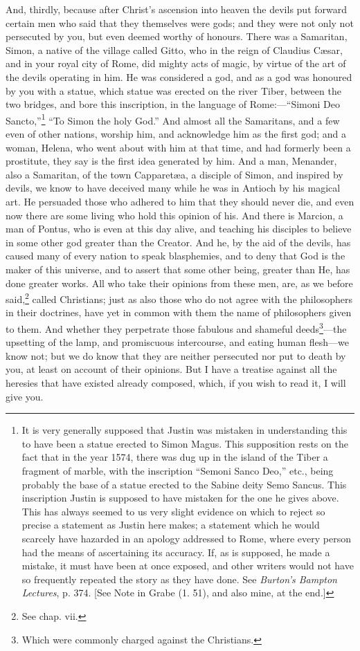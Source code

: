 And, thirdly, because after Christ’s ascension into heaven the devils put forward certain men who said that they themselves were gods; and they were not only not persecuted by you, but even deemed worthy of honours. There was a Samaritan, Simon, a native of the village called Gitto, who in the reign of Claudius Cæsar, and in your royal city of Rome, did mighty acts of magic, by virtue of the art of the devils operating in him. He was considered a god, and as a god was honoured by you with a statue, which statue was erected on the river Tiber, between the two bridges, and bore this inscription, in the language of Rome:—“Simoni Deo Sancto,”\footnote{It is very generally supposed that Justin was mistaken in understanding this to have been a statue erected to Simon Magus. This supposition rests on the fact that in the year 1574, there was dug up in the island of the Tiber a fragment of marble, with the inscription “Semoni Sanco Deo,” etc., being probably the base of a statue erected to the Sabine deity Semo Sancus. This inscription Justin is supposed to have mistaken for the one he gives above. This has always seemed to us very slight evidence on which to reject so precise a statement as Justin here makes; a statement which he would scarcely have hazarded in an apology addressed to Rome, where every person had the means of ascertaining its accuracy. If, as is supposed, he made a mistake, it must have been at once exposed, and other writers would not have so frequently repeated the story as they have done. See \emph{Burton’s Bampton Lectures}, p. 374. [See Note in Grabe (1. 51), and also mine, at the end.]} “To Simon the holy God.” And almost all the Samaritans, and a few even of other nations, worship him, and acknowledge him as the first god; and a woman, Helena, who went about with him at that time, and had formerly been a prostitute, they say is the first idea generated by him. And a man, Menander, also a Samaritan, of the town Capparetæa, a disciple of Simon, and inspired by devils, we know to have deceived many while he was in Antioch by his magical art. He persuaded those who adhered to him that they should never die, and even now there are some living who hold this opinion of his. And there is Marcion, a man of Pontus, who is even at this day alive, and teaching his disciples to believe in some other god greater than the Creator. And he, by the aid of the devils, has caused many of every nation to speak blasphemies, and to deny that God is the maker of this universe, and to assert that some other being, greater than He, has done greater works. All who take their opinions from these men, are, as we before said,\footnote{See chap. vii.} called Christians; just as also those who do not agree with  the philosophers in their doctrines, have yet in common with them the name of philosophers given to them. And whether they perpetrate those fabulous and shameful deeds\footnote{Which were commonly charged against the Christians.}—the upsetting of the lamp, and promiscuous intercourse, and eating human flesh—we know not; but we do know that they are neither persecuted nor put to death by you, at least on account of their opinions. But I have a treatise against all the heresies that have existed already composed, which, if you wish to read it, I will give you.

